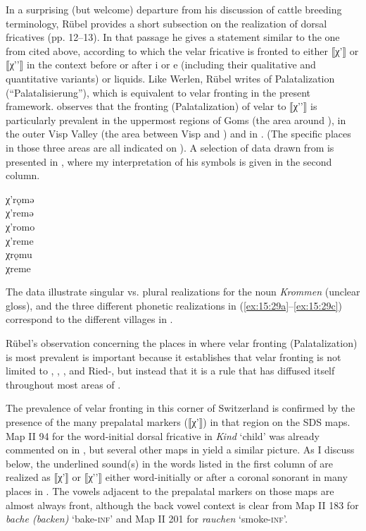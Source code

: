 {In a surprising (but welcome) departure from his discussion of cattle breeding terminology, Rübel provides a short subsection on the realization of dorsal fricatives (pp. 12--13). In that passage he gives a statement similar to the one from \citet{Schmid1969} cited above, according to which the velar fricative is fronted to either ⟦χ'⟧ or ⟦χ'{}'⟧ in the context before or after i or e (including their qualitative and quantitative variants) or liquids. Like Werlen, Rübel writes of Palatalization (“Palatalisierung”), which is equivalent to velar fronting in the present framework. \citet[13]{Rübel1950} observes that the fronting (Palatalization) of velar to ⟦χ'{}'⟧ is particularly prevalent in the uppermost regions of Goms (the area around ), in the outer Visp Valley (the area between Visp and ) and in . (The specific places in those three areas are all indicated on ). A selection of data drawn from \citet[9]{Rübel1950} is presented in , where my interpretation of his symbols is given in the second column.

\ea%
\label{ex:15:29}
\ea\label{ex:15:29a} χ'rǫmə \tab [çrɔmə]\\
    χ'remə \tab [çremə]\\
\ex\label{ex:15:29b} χ'romo \tab [çromo]\\
    χ'reme \tab [çreme]\\
\ex\label{ex:15:29c} χrǫmu  \tab [xrɔmu]\\
    χreme  \tab [xreme]\\
\z 
\z 

The data illustrate singular vs. plural realizations for the noun \textit{Krommen} (unclear gloss), and the three different phonetic realizations in (\ref{ex:15:29a}--\ref{ex:15:29c}) correspond to the different villages in .\largerpage[-1]

Rübel’s observation concerning the places in  where velar fronting (Palatalization) is most prevalent is important because it establishes that velar fronting is not limited to , , , and Ried-, but instead that it is a rule that has diffused itself throughout most areas of .

The prevalence of velar fronting in this corner of Switzerland is confirmed by the presence of the many prepalatal markers (⟦χ'⟧) in that region on the SDS maps. Map II 94 for the word-initial dorsal fricative in \textit{Kind} ‘child’ was already commented on in , but several other maps in  yield a similar picture. As I discuss below, the underlined sound(s) in the words listed in the first column of  are realized as ⟦χ'⟧ or ⟦χ'{}'⟧ either word-initially or after a coronal sonorant in many places in . The vowels adjacent to the prepalatal markers on those maps are almost always front, although the back vowel context is clear from Map II 183 for \textit{bache (backen)} ‘bake-\textsc{inf}’ and Map II 201 for \textit{rauchen} ‘smoke-\textsc{inf}’.

}
